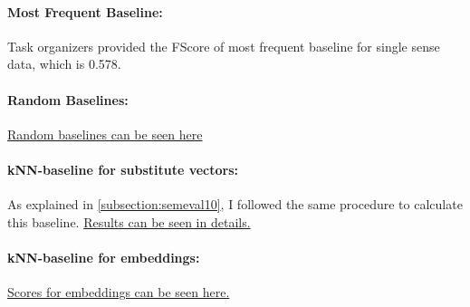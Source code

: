 \paragraph{Most Frequent Baseline:} Task organizers provided the FScore of most frequent baseline for single sense data, which is 0.578.
\paragraph{Random Baselines:} \href{link}{Random baselines can be seen here}
\paragraph{kNN-baseline for substitute vectors:} As explained in \ref{subsection:semeval10}, I followed the same procedure to calculate this baseline. \href{http://goo.gl/J88G7R}{Results can be seen in details.}
\paragraph{kNN-baseline for embeddings:} \href{link}{Scores for embeddings can be seen here.}
